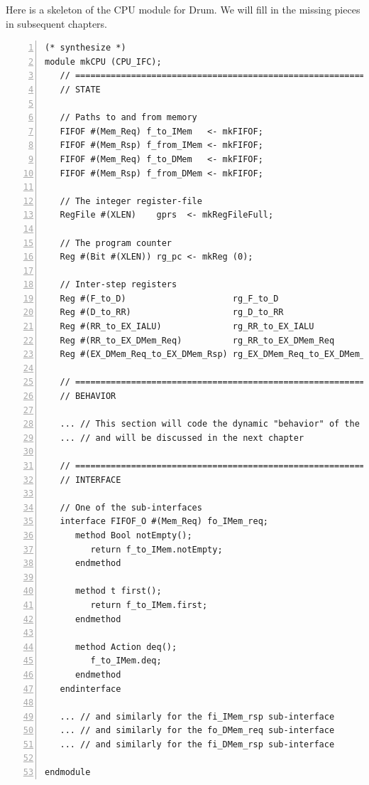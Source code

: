 \label{Sec_CPU_Module_Skeleton_skeleton_CPU_module}


Here is a skeleton of the CPU module for Drum.  We will fill in
the missing pieces in subsequent chapters.

\begin{Verbatim}[frame=single, numbers=left]
(* synthesize *)
module mkCPU (CPU_IFC);
   // ================================================================
   // STATE

   // Paths to and from memory
   FIFOF #(Mem_Req) f_to_IMem   <- mkFIFOF;
   FIFOF #(Mem_Rsp) f_from_IMem <- mkFIFOF;
   FIFOF #(Mem_Req) f_to_DMem   <- mkFIFOF;
   FIFOF #(Mem_Rsp) f_from_DMem <- mkFIFOF;

   // The integer register-file
   RegFile #(XLEN)    gprs  <- mkRegFileFull;

   // The program counter
   Reg #(Bit #(XLEN)) rg_pc <- mkReg (0);

   // Inter-step registers
   Reg #(F_to_D)                     rg_F_to_D                  <- mkRegU;
   Reg #(D_to_RR)                    rg_D_to_RR                 <- mkRegU;
   Reg #(RR_to_EX_IALU)              rg_RR_to_EX_IALU           <- mkRegU;
   Reg #(RR_to_EX_DMem_Req)          rg_RR_to_EX_DMem_Req       <- mkRegU;
   Reg #(EX_DMem_Req_to_EX_DMem_Rsp) rg_EX_DMem_Req_to_EX_DMem_Rsp <- mkRegU;

   // ================================================================
   // BEHAVIOR

   ... // This section will code the dynamic "behavior" of the module
   ... // and will be discussed in the next chapter

   // ================================================================
   // INTERFACE

   // One of the sub-interfaces
   interface FIFOF_O #(Mem_Req) fo_IMem_req;
      method Bool notEmpty();
         return f_to_IMem.notEmpty;
      endmethod

      method t first();
         return f_to_IMem.first;
      endmethod

      method Action deq();
         f_to_IMem.deq;
      endmethod
   endinterface

   ... // and similarly for the fi_IMem_rsp sub-interface
   ... // and similarly for the fo_DMem_req sub-interface
   ... // and similarly for the fi_DMem_rsp sub-interface

endmodule

\end{Verbatim}

